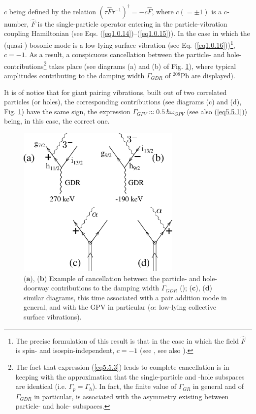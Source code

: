 $c$ being defined by the relation $(\tau \hat F\tau^{-1})^\dagger=-c\hat F$, where $c(=\pm1)$ is a c-number, $\hat F$ is the single-particle operator entering in the particle-vibration coupling Hamiltonian (see Eqs. (\ref{eq1.0.14})--(\ref{eq1.0.15})). In the case in which the (quasi-) bosonic mode is a low-lying surface vibration (see Eq. (\ref{eq1.0.16}))\footnote{The precise formulation of this result is that in the case in which the field $\hat F$ is spin- and isospin-independent, $c=-1$ (see \cite{Bortignon:83}, see also \cite{Bortignon:81}).}, $c=-1$. As a result, a conspicuous cancellation between the particle- and hole-contributions\footnote{The fact that expression (\ref{eq5.5.3}) leads to complete cancellation is in keeping with the approximation that the single-particle and -hole subspaces are identical (i.e. $\Gamma_p=\Gamma_h$). In fact, the finite value of $\Gamma_{GR}$ in general and of $\Gamma_{GDR}$ in particular, is associated with the asymmetry existing between particle- and hole- subspaces.} takes place (see diagrams (a) and (b) of Fig. \ref{fig5.5.3}), where typical amplitudes contributing to the damping width $\Gamma_{GDR}$ of $^{208}$Pb are displayed). 


It is of notice that for giant pairing vibrations,  built out of two correlated particles (or holes), the corresponding contributions (see diagrams (c) and (d), Fig. \ref{fig5.5.3}) have the same sign, the expression $\Gamma_{GPV}\approx0.5\,\hbar\omega_{GPV}$ (see also (\ref{eq5.5.1})) being, in this case, the correct one.


 
 \begin{figure}
	\centerline{\includegraphics*[width=8cm,angle=0]{C6/figs_C6/fig5_5_3}}
	\caption{ (\textbf{a}), (\textbf{b}) Example of cancellation between the particle- and hole- doorway contributions to the damping width $\Gamma_{GDR}$ (\cite{Bortignon:83}); (\textbf{c}), (\textbf{d}) similar diagrams,  this time associated with a pair addition mode in general, and with the GPV in particular ($\alpha$: low-lying collective surface vibrations).}\label{fig5.5.3}
\end{figure}
 
